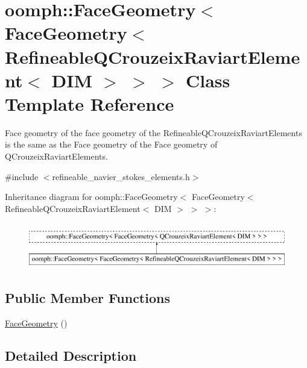 \hypertarget{classoomph_1_1FaceGeometry_3_01FaceGeometry_3_01RefineableQCrouzeixRaviartElement_3_01DIM_01_4_01_4_01_4}{}\section{oomph\+:\+:Face\+Geometry$<$ Face\+Geometry$<$ Refineable\+Q\+Crouzeix\+Raviart\+Element$<$ D\+IM $>$ $>$ $>$ Class Template Reference}
\label{classoomph_1_1FaceGeometry_3_01FaceGeometry_3_01RefineableQCrouzeixRaviartElement_3_01DIM_01_4_01_4_01_4}


Face geometry of the face geometry of the Refineable\+Q\+Crouzeix\+Raviart\+Elements is the same as the Face geometry of the Face geometry of Q\+Crouzeix\+Raviart\+Elements.  




{\ttfamily \#include $<$refineable\+\_\+navier\+\_\+stokes\+\_\+elements.\+h$>$}

Inheritance diagram for oomph\+:\+:Face\+Geometry$<$ Face\+Geometry$<$ Refineable\+Q\+Crouzeix\+Raviart\+Element$<$ D\+IM $>$ $>$ $>$\+:\begin{figure}[H]
\begin{center}
\leavevmode
\includegraphics[height=2.000000cm]{classoomph_1_1FaceGeometry_3_01FaceGeometry_3_01RefineableQCrouzeixRaviartElement_3_01DIM_01_4_01_4_01_4}
\end{center}
\end{figure}
\subsection*{Public Member Functions}
\begin{DoxyCompactItemize}
\item 
\hyperlink{classoomph_1_1FaceGeometry_3_01FaceGeometry_3_01RefineableQCrouzeixRaviartElement_3_01DIM_01_4_01_4_01_4_af3742715a4d40830eee7b4adb8bd92f3}{Face\+Geometry} ()
\end{DoxyCompactItemize}


\subsection{Detailed Description}
